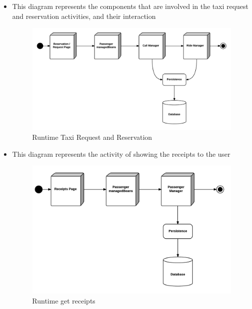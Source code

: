\begin{itemize}
	\item This diagram represents the components that are involved in the taxi request and reservation activities, and their interaction
	\begin{figure}[htbp]
	\centering
	\includegraphics[width=\textwidth]{cpt/img/RuntimeReqResView}
	\caption{Runtime Taxi Request and Reservation}
	\end{figure}
	\clearpage
	
	\item This diagram represents the activity of showing the receipts to the user
	\begin{figure}[htbp]
	\centering
	\includegraphics[width=\textwidth]{cpt/img/RuntimeReceiptsView}
	\caption{Runtime get receipts}
	\end{figure}
	\clearpage
	

\end{itemize}
